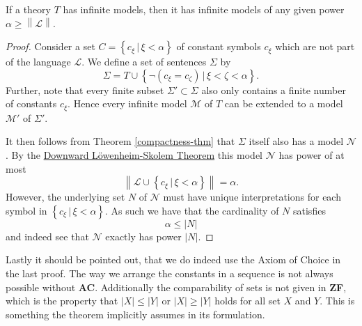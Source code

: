 \documentclass[../../main.tex]{subfiles}
\begin{document}
\begin{theorem}\label{up-lowenheim-skolem}\cite[Corollary 2.1.6]{Cha90}
    If a theory $T$ has infinite models, then it has infinite models of any given power $\alpha \geq \left\lVert \mathcal{L} \right\rVert$.
\end{theorem}

\begin{proof}
    Consider a set $C = \left\{c_\xi \,\vert\, \xi < \alpha\right\}$ of constant symbols $c_\xi$ which are not part of the language $\mathcal{L}$.
    We define a set of sentences $\Sigma$ by
    $$\Sigma = T \cup \left\{\lnot (c_\xi = c_\zeta) \,\vert\, \xi < \zeta < \alpha\right\}.$$
    Further, note that every finite subset $\Sigma' \subset \Sigma$ also only contains a finite number of constants $c_\xi$.
    Hence every infinite model $\mathcal{M}$ of $T$ can be extended to a model $\mathcal{M}'$ of $\Sigma'$.

    It then follows from Theorem \ref{compactness-thm} that $\Sigma$ itself also has a model $\mathcal{N}$.
    By the \hyperref[down-lowenheim-skolem]{Downward Löwenheim-Skolem Theorem} this model   $\mathcal{N}$ has power of at most
    $$\left\lVert \mathcal{L} \cup \left\{c_\xi \,\vert\, \xi < \alpha\right\}\right\rVert = \alpha.$$
    However, the underlying set $N$ of $\mathcal{N}$ must have unique interpretations for each symbol in $\left\{c_\xi \,\vert\, \xi < \alpha\right\}$.
    As such we have that the cardinality of $N$ satisfies
    $$\alpha \leq \left\lvert N\right\rvert$$
    and indeed see that $\mathcal{N}$ exactly has power $\left\lvert N\right\rvert$.
\end{proof}

Lastly it should be pointed out, that we do indeed use the Axiom of Choice in the last proof.
The way we arrange the constants in a sequence is not always possible without \textbf{AC}.
Additionally the comparability of sets is not given in \textbf{ZF}, which is the property that $\left\lvert X\right\rvert \leq \left\lvert Y\right\rvert$ or $\left\lvert X\right\rvert \geq \left\lvert Y\right\rvert$ holds for all set $X$ and $Y$.
This is something the theorem implicitly assumes in its formulation.
\end{document}
